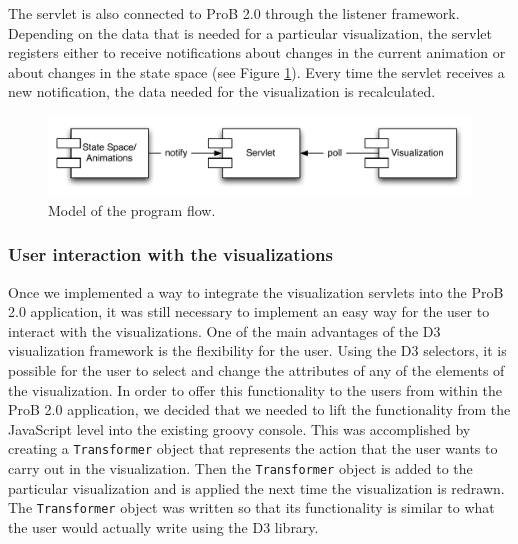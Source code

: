 The servlet is also connected to ProB 2.0 through the listener framework. Depending on the data that is needed for a particular visualization, the servlet registers either to receive notifications about changes in the current animation or about changes in the state space (see Figure \ref{programFlow}). Every time the servlet receives a new notification, the data needed for the visualization is recalculated.

\begin{center}
\begin{figure}[h!]
\includegraphics[width=14cm]{bilder/programFlow.pdf}
\caption{Model of the program flow.}
\label{programFlow}
\end{figure}
\end{center}

\subsubsection{User interaction with the visualizations}

Once we implemented a way to integrate the visualization servlets into the ProB 2.0 application, it was still necessary to implement an easy way for the user to interact with the visualizations. One of the main advantages of the D3 visualization framework is the flexibility for the user. Using the D3 selectors, it is possible for the user to select and change the attributes of any of the elements of the visualization. In order to offer this functionality to the users from within the ProB 2.0 application, we decided that we needed to lift the functionality from the JavaScript level into the existing groovy console. This was accomplished by creating a \texttt{Transformer} object that represents the action that the user wants to carry out in the visualization. Then the \texttt{Transformer} object is added to the particular visualization and is applied the next time the visualization is redrawn. The \texttt{Transformer} object was written so that its functionality is similar to what the user would actually write using the D3 library.

